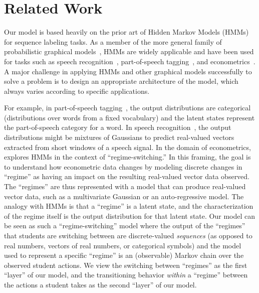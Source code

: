 \section{Related Work}

Our model is based heavily on the prior art of Hidden Markov Models
(HMMs)~\cite{Rabiner:1990:RSR} for sequence labeling tasks. As a member of
the more general family of probabilistic graphical
models~\cite{Koller:2009:PGM}, HMMs are widely applicable and have been
used for tasks such as speech recognition~\cite{Huang:1990:HMM},
part-of-speech tagging~\cite{Jurafsky:2009:SLP}, and
econometrics~\cite{Hamilton:1990:JoE}. A major challenge in applying HMMs
and other graphical models successfully to solve a problem is to design an
appropriate architecture of the model, which always varies according to
specific applications.

For example, in part-of-speech tagging~\cite{Jurafsky:2009:SLP}, the output
distributions are categorical (distributions over words from a fixed
vocabulary) and the latent states represent the part-of-speech category for
a word. In speech recognition~\cite{Huang:1990:HMM}, the output
distributions might be mixtures of Gaussians to predict real-valued vectors
extracted from short windows of a speech signal. In the domain of
econometrics, \citet{Hamilton:1990:JoE} explores HMMs in the context of
``regime-switching.'' In this framing, the goal is to understand how
econometric data changes by modeling discrete changes in ``regime'' as
having an impact on the resulting real-valued vector data observed. The
``regimes'' are thus represented with a model that can produce real-valued
vector data, such as a multivariate Gaussian or an auto-regressive model.
The analogy with HMMs is that a ``regime'' is a latent state, and the
characterization of the regime itself is the output distribution for that
latent state. Our model can be seen as such a ``regime-switching'' model
where the output of the ``regimes'' that students are switching between are
discrete-valued \emph{sequences} (as opposed to real numbers, vectors of
real numbers, or categorical symbols) and the model used to represent a
specific ``regime'' is an (observable) Markov chain over the observed
student actions. We view the switching between ``regimes'' as the first
``layer'' of our model, and the transitioning behavior \emph{within} a
``regime'' between the actions a student takes as the second ``layer'' of
our model.

